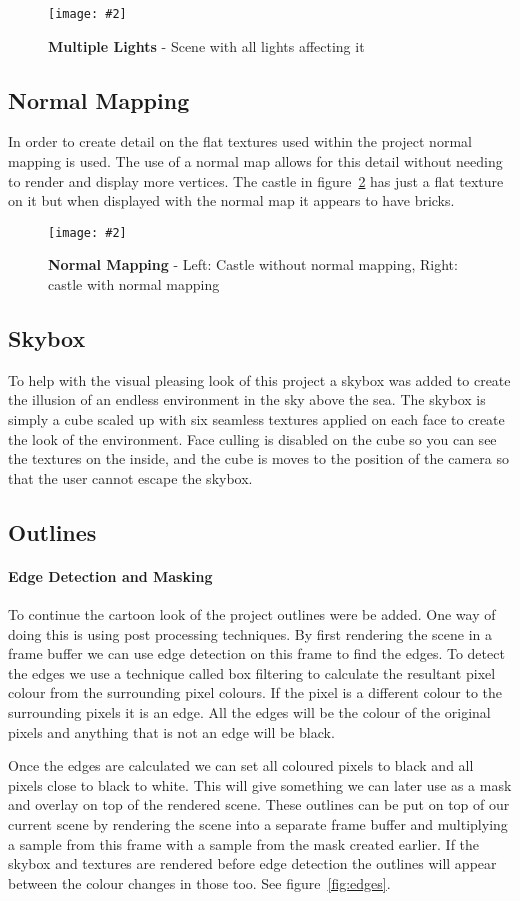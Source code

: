 \documentclass[10pt, a4paper]{article}
\newcommand{\figuremacro}[5]{
    \begin{figure}[#1]
        \centering
        \texttt{[image: \#2]}
        \caption[#3]{\textbf{#3}#4}
        \label{fig:#2}
    \end{figure}
}
\begin{document}
	 \figuremacro{h}{Multiple}{Multiple Lights}{ - Scene with all lights affecting it}{1.0}
	 
	 \subsection{Normal Mapping}
	 In order to create detail on the flat textures used within the project normal mapping is used. The use of a normal map allows for this detail without needing to render and display more vertices. The castle in figure~\ref{fig:Normals} has just a flat texture on it but when displayed with the normal map it appears to have bricks.
	 
	 \figuremacro{h}{Normals}{Normal Mapping}{ - Left: Castle without normal mapping, Right: castle with normal mapping}{1.0}
	 
	 \subsection{Skybox}
	 To help with the visual pleasing look of this project a skybox was added to create the illusion of an endless environment in the sky above the sea. The skybox is simply a cube scaled up with six seamless textures applied on each face to create the look of the environment. Face culling is disabled on the cube so you can see the textures on the inside, and the cube is moves to the position of the camera so that the user cannot escape the skybox.
	 
	 \subsection{Outlines}
	 \paragraph{Edge Detection and Masking}
	 To continue the cartoon look of the project outlines were be added. One way of doing this is using post processing techniques. By first rendering the scene in a frame buffer we can use edge detection on this frame to find the edges. To detect the edges we use a technique called box filtering to calculate the resultant pixel colour from the surrounding pixel colours. If the pixel is a different colour to the surrounding pixels it is an edge. All the edges will be the colour of the original pixels and anything that is not an edge will be black.
	 
	 Once the edges are calculated we can set all coloured pixels to black and all pixels close to black to white. This will give something we can later use as a mask and overlay on top of the rendered scene. These outlines can be put on top of our current scene by rendering the scene into a separate frame buffer and multiplying a sample from this frame with a sample from the mask created earlier. If the skybox and textures are rendered before edge detection the outlines will appear between the colour changes in those too. See figure~\ref{fig:edges}.
	 
\end{document}
